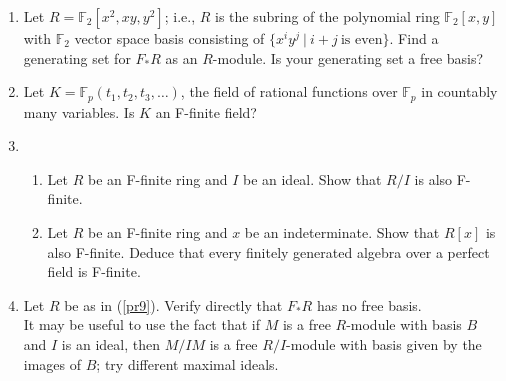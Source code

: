 \documentclass[12pt]{amsart}
\theoremstyle{definition}
\numberwithin{equation}{theorem}
\def\Hom{\operatorname{Hom}}
\def\FF{\mathbb{F}}
\def\ZZ{\mathbb{Z}}
\def\phi{\varphi}
\begin{document}
\begin{enumerate}
\item\label{pr9} Let $R=\FF_2[x^2, xy,y^2]$; i.e., $R$ is the subring of the polynomial ring $\FF_2[x,y]$ with $\FF_2$ vector space basis consisting of $\{x^i y^j \ | \ i+j \ \text{is even}\}$. Find a generating set for $F_*R$ as an $R$-module. Is your generating set a free basis?
\item Let $K = \FF_p(t_1,t_2,t_3,\dots)$, the field of rational functions over $\FF_p$ in countably many variables. Is $K$ an F-finite field?
\item \begin{enumerate}
\item Let $R$ be an F-finite ring and $I$ be an ideal. Show that $R/I$ is also F-finite.
\item Let $R$ be an F-finite ring and $x$ be an indeterminate. Show that $R[x]$ is also F-finite. Deduce that every finitely generated algebra over a perfect field is F-finite.
\end{enumerate}
\item Let $R$ be as in (\ref{pr9}). Verify directly that $F_*R$ has no free basis.\\ It may be useful to use the fact that if $M$ is a free $R$-module with basis $B$ and $I$ is an ideal, then $M/IM$ is a free $R/I$-module with basis given by the images of $B$; try different maximal ideals.
\end{enumerate}
\end{document}
